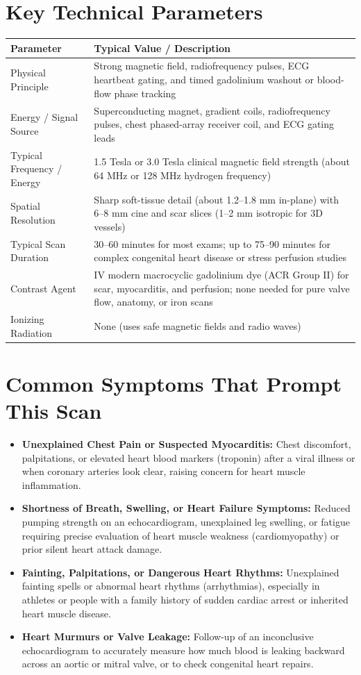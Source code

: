 \section{Key Technical Parameters}
\noindent
\begin{tabularx}{\textwidth}{@{}l X@{}}
\toprule
\textbf{Parameter} & \textbf{Typical Value / Description} \\
\midrule
Physical Principle & Strong magnetic field, radiofrequency pulses, ECG heartbeat gating, and timed gadolinium washout or blood-flow phase tracking \\
Energy / Signal Source & Superconducting magnet, gradient coils, radiofrequency pulses, chest phased-array receiver coil, and ECG gating leads \\
Typical Frequency / Energy & 1.5 Tesla or 3.0 Tesla clinical magnetic field strength (about 64 MHz or 128 MHz hydrogen frequency) \\
Spatial Resolution & Sharp soft-tissue detail (about 1.2--1.8 mm in-plane) with 6--8 mm cine and scar slices (1--2 mm isotropic for 3D vessels) \\
Typical Scan Duration & 30--60 minutes for most exams; up to 75--90 minutes for complex congenital heart disease or stress perfusion studies \\
Contrast Agent & IV modern macrocyclic gadolinium dye (ACR Group II) for scar, myocarditis, and perfusion; none needed for pure valve flow, anatomy, or iron scans \\
Ionizing Radiation & None (uses safe magnetic fields and radio waves) \\
\bottomrule
\end{tabularx}

\section{Common Symptoms That Prompt This Scan}
\begin{itemize}
\item \textbf{Unexplained Chest Pain or Suspected Myocarditis:} Chest discomfort, palpitations, or elevated heart blood markers (troponin) after a viral illness or when coronary arteries look clear, raising concern for heart muscle inflammation.
\item \textbf{Shortness of Breath, Swelling, or Heart Failure Symptoms:} Reduced pumping strength on an echocardiogram, unexplained leg swelling, or fatigue requiring precise evaluation of heart muscle weakness (cardiomyopathy) or prior silent heart attack damage.
\item \textbf{Fainting, Palpitations, or Dangerous Heart Rhythms:} Unexplained fainting spells or abnormal heart rhythms (arrhythmias), especially in athletes or people with a family history of sudden cardiac arrest or inherited heart muscle disease.
\item \textbf{Heart Murmurs or Valve Leakage:} Follow-up of an inconclusive echocardiogram to accurately measure how much blood is leaking backward across an aortic or mitral valve, or to check congenital heart repairs.
\end{itemize}

